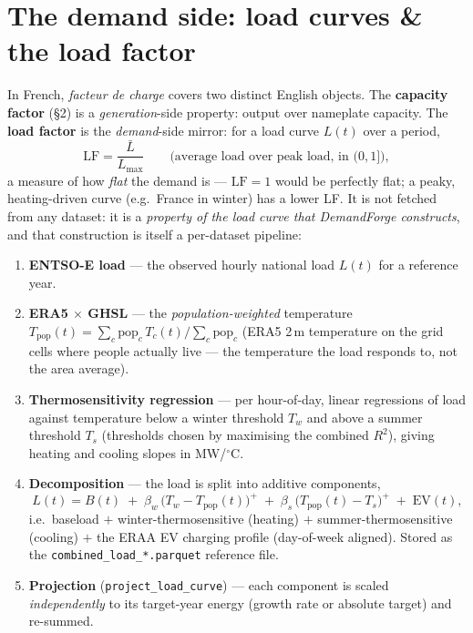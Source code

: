 \documentclass[11pt,a4paper]{article}
\begin{document}
\section{The demand side: load curves \& the load factor}
\label{sec:loadfactor}
In French, \emph{facteur de charge} covers two distinct English objects. The \textbf{capacity factor}
(\S2) is a \emph{generation}-side property: output over nameplate capacity. The \textbf{load factor} is
the \emph{demand}-side mirror: for a load curve $L(t)$ over a period,
\begin{equation}
\mathrm{LF}=\frac{\bar L}{L_{\max}}
\qquad\text{(average load over peak load, in } (0,1]\text{)},
\label{eq:lf}
\end{equation}
a measure of how \emph{flat} the demand is --- $\mathrm{LF}=1$ would be perfectly flat; a peaky,
heating-driven curve (e.g.\ France in winter) has a lower LF. It is not fetched from any dataset: it is a
\emph{property of the load curve that DemandForge constructs}, and that construction is itself a
per-dataset pipeline:
\begin{enumerate}[nosep]
  \item \textbf{ENTSO-E load} --- the observed hourly national load $L(t)$ for a reference year.
  \item \textbf{ERA5 $\times$ GHSL} --- the \emph{population-weighted} temperature
        $T_{\mathrm{pop}}(t)=\sum_c \mathrm{pop}_c\,T_c(t)\big/\sum_c \mathrm{pop}_c$ (ERA5 2\,m
        temperature on the grid cells where people actually live --- the temperature the load responds
        to, not the area average).
  \item \textbf{Thermosensitivity regression} --- per hour-of-day, linear regressions of load against
        temperature below a winter threshold $T_w$ and above a summer threshold $T_s$ (thresholds chosen
        by maximising the combined $R^2$), giving heating and cooling slopes in MW/$^\circ$C.
  \item \textbf{Decomposition} --- the load is split into additive components,
        \begin{equation}
        L(t)=B(t)\;+\;\beta_w\,\bigl(T_w-T_{\mathrm{pop}}(t)\bigr)^{+}\;+\;
        \beta_s\,\bigl(T_{\mathrm{pop}}(t)-T_s\bigr)^{+}\;+\;\mathrm{EV}(t),
        \label{eq:decomp}
        \end{equation}
        i.e.\ baseload $+$ winter-thermosensitive (heating) $+$ summer-thermosensitive (cooling) $+$ the
        ERAA EV charging profile (day-of-week aligned). Stored as the
        \texttt{combined\_load\_*.parquet} reference file.
  \item \textbf{Projection} (\texttt{project\_load\_curve}) --- each component is scaled
        \emph{independently} to its target-year energy (growth rate or absolute target) and re-summed.
\end{enumerate}
\end{document}
